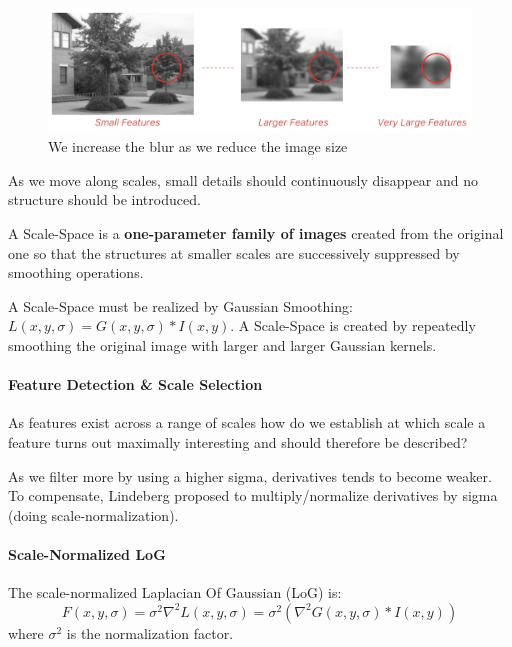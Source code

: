 \documentclass{article}
\begin{document}
\begin{figure}[htbp]
  \centering
  \includegraphics[width=0.9\linewidth]{./img/scale_space.jpg}
  \caption{We increase the blur as we reduce the image size}
  \label{fig:scale_space}
\end{figure}

As we move along scales, small details should continuously disappear and no structure should be introduced.

A Scale-Space is a \textbf{one-parameter family of images} created from the original one so that the structures at smaller scales are successively suppressed by smoothing operations.

A Scale-Space must be realized by Gaussian Smoothing: $L(x,y,\sigma) = G(x,y,\sigma) * I(x,y)$.
A Scale-Space is created by repeatedly smoothing the original image with larger and larger Gaussian kernels.

\paragraph{Feature Detection \& Scale Selection}
As features exist across a range of scales how do we establish at which scale a feature turns out maximally interesting and should therefore be described?


As we filter more by using a higher sigma, derivatives tends to become weaker.
To compensate, Lindeberg proposed to multiply/normalize derivatives by sigma (doing scale-normalization).

\paragraph{Scale-Normalized LoG}

The scale-normalized Laplacian Of Gaussian (LoG) is: 
$$F(x,y,\sigma) = \sigma^2\nabla^2 L(x,y,\sigma) = \sigma^2(\nabla^2 G(x,y,\sigma) * I(x,y))$$ where $\sigma^2$ is the normalization factor.
\end{document}
